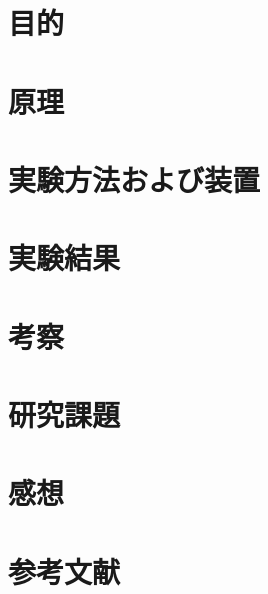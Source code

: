 \documentclass[dvipdfmx,a4paper,11pt]{jsarticle}
\begin{document}
\maketuatcover

\section{目的}
\section{原理}
\section{実験方法および装置}
\section{実験結果}
\section{考察}
\section{研究課題}
\section{感想}
\section*{参考文献}
\end{document}
